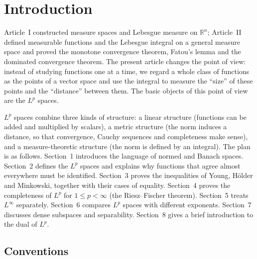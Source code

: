 \documentclass[11pt]{article}
\newcommand{\R}{\mathbb{R}}
\begin{document}
\maketitle

\section*{Introduction}

Article~I constructed measure spaces and Lebesgue measure on $\R^{n}$; Article~II defined measurable functions and the Lebesgue integral on a general measure space and proved the monotone convergence theorem, Fatou's lemma and the dominated convergence theorem. The present article changes the point of view: instead of studying functions one at a time, we regard a whole class of functions as the points of a vector space and use the integral to measure the ``size'' of these points and the ``distance'' between them. The basic objects of this point of view are the $L^{p}$ spaces.

$L^{p}$ spaces combine three kinds of structure: a linear structure (functions can be added and multiplied by scalars), a metric structure (the norm induces a distance, so that convergence, Cauchy sequences and completeness make sense), and a measure-theoretic structure (the norm is defined by an integral). The plan is as follows. Section~1 introduces the language of normed and Banach spaces. Section~2 defines the $L^{p}$ spaces and explains why functions that agree almost everywhere must be identified. Section~3 proves the inequalities of Young, Hölder and Minkowski, together with their cases of equality. Section~4 proves the completeness of $L^{p}$ for $1\le p<\infty$ (the Riesz--Fischer theorem). Section~5 treats $L^{\infty}$ separately. Section~6 compares $L^{p}$ spaces with different exponents. Section~7 discusses dense subspaces and separability. Section~8 gives a brief introduction to the dual of $L^{p}$.

\subsection*{Conventions}
\end{document}
